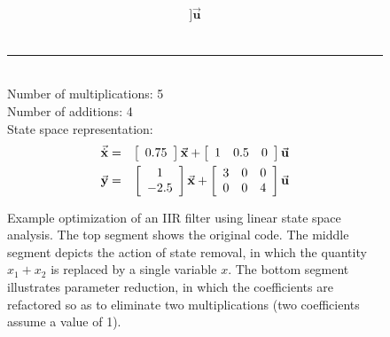 \begin{figure*}[t]
\begin{singlespace}
{\begin{minipage}{3.5in}
\begin{eqnarray*}
 ] \vec{\mathbf{u}}
\end{eqnarray*}
\vspace{20pt} ~ \\
\hrule
\vspace{30pt} ~ \\
Number of multiplications: 5 \\
Number of additions: 4 \\
State space representation:
\begin{eqnarray*}
\small
\vec{\dot{\mathbf{x}}} & = & \left [ \begin{array} {cc} 0.75
\end{array} \right ] \vec{\mathbf{x}} + \left [ \begin{array} {ccc} 1 & 0.5 & 0 \end{array} \right ] \vec{\mathbf{u}} \\
\vec{\mathbf{y}} & = & \left [ \begin{array} {cc} 1 \\ -2.5
\end{array} \right ] \vec{\mathbf{x}} + \left [ \begin{array} {ccc} 3 & 0 & 0 \\ 0 & 0 & 4 \end{array} \right
 ] \vec{\mathbf{u}}
\end{eqnarray*}
\end{minipage}}
\end{singlespace}
\begin{center}
\vspace{-23pt}

\caption{Example optimization of an IIR filter using linear state
space analysis.  The top segment shows the original code.  The middle
segment depicts the action of state removal, in which the quantity
$x_1 + x_2$ is replaced by a single variable $x$.  The bottom segment
illustrates parameter reduction, in which the coefficients are
refactored so as to eliminate two multiplications (two coefficients
assume a value of 1).\protect\label{fig:opt-seq}}
\end{center}
\vspace{-12pt}
\end{figure*}
